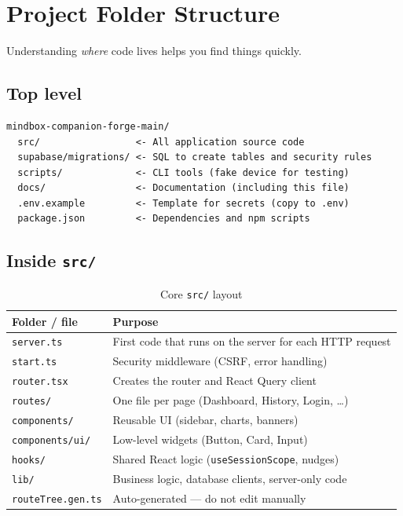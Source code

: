 \documentclass[11pt,a4paper]{article}
\newcommand{\filepath}[1]{\texttt{#1}}
\begin{document}
\section{Project Folder Structure}

Understanding \emph{where} code lives helps you find things quickly.

\subsection{Top level}

\begin{lstlisting}
mindbox-companion-forge-main/
  src/                 <- All application source code
  supabase/migrations/ <- SQL to create tables and security rules
  scripts/             <- CLI tools (fake device for testing)
  docs/                <- Documentation (including this file)
  .env.example         <- Template for secrets (copy to .env)
  package.json         <- Dependencies and npm scripts
\end{lstlisting}

\subsection{Inside \filepath{src/}}

\begin{table}[h]
\centering
\small
\begin{tabular}{@{}ll@{}}
\toprule
Folder / file & Purpose \\
\midrule
\filepath{server.ts} & First code that runs on the server for each HTTP request \\
\filepath{start.ts} & Security middleware (CSRF, error handling) \\
\filepath{router.tsx} & Creates the router and React Query client \\
\filepath{routes/} & One file per page (Dashboard, History, Login, \ldots) \\
\filepath{components/} & Reusable UI (sidebar, charts, banners) \\
\filepath{components/ui/} & Low-level widgets (Button, Card, Input) \\
\filepath{hooks/} & Shared React logic (\texttt{useSessionScope}, nudges) \\
\filepath{lib/} & Business logic, database clients, server-only code \\
\filepath{routeTree.gen.ts} & Auto-generated --- do not edit manually \\
\bottomrule
\end{tabular}
\caption{Core \filepath{src/} layout}
\end{table}
\end{document}
